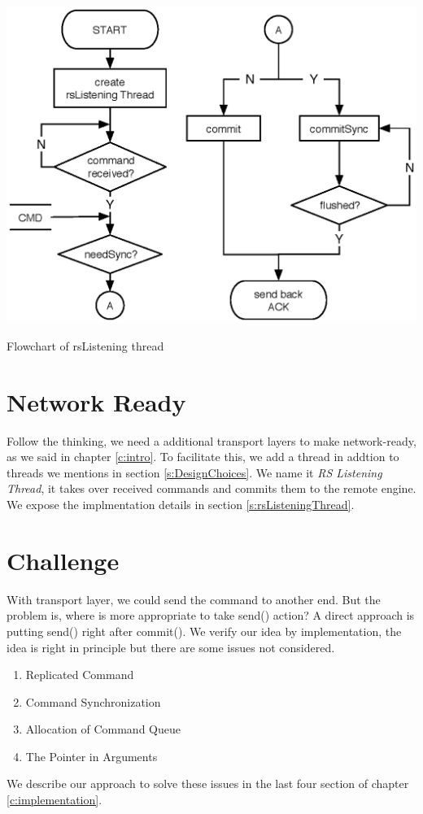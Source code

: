 \begin{center-figure}
	\includegraphics[scale=0.8]{fig/rsListeningThread_flowchart.eps}
	\caption{Flowchart of rsListening thread}
	\label{fig:rsListeningThread_flowchart}
\end{center-figure}

\section{Network Ready}
\label{s:NetworkReady}

Follow the thinking, we need a additional transport layers to make \RS{} network-ready, as we said in chapter \ref{c:intro}. To facilitate this, we add a thread in addtion to threads we mentions in section \ref{s:DesignChoices}. We name it \textit{RS Listening Thread}, it takes over received commands and commits them to the remote engine. We expose the implmentation details in section \ref{s:rsListeningThread}.

\section{Challenge}
\label{s:challenge}
With transport layer, we could send the command to another end. But the problem is, where is more appropriate to take send() action? A direct approach is putting send() right after commit(). We verify our idea by implementation, the idea is right in principle but there are some issues not considered.
\begin{enumerate}

\item Replicated Command
\item Command Synchronization 
\item Allocation of Command Queue
\item The Pointer in Arguments
\end{enumerate}

We describe our approach to solve these issues in the last four section of chapter \ref{c:implementation}.




